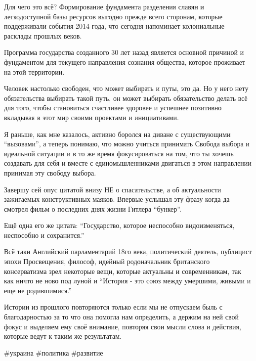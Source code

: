 Для чего это всё? Формирование фундамента разделения славян и легкодоступной
базы ресурсов выгодно прежде всего сторонам, которые поддерживали события 2014
года, что сегодня напоминает колониальные расклады прошлых веков.

Программа государства созданного 30 лет назад является основной причиной и
фундаментом для текущего направления сознания общества, которое проживает на
этой территории.

Человек настолько свободен, что может выбирать и путы, это да. Но у него нету
обязательства выбирать такой путь, он может выбирать обязательство делать всё
для того, чтобы становиться счастливее здоровее и успешнее позитивно вкладывая
в этот мир своими проектами и инициативами. 

Я раньше, как мне казалось, активно боролся на диване с существующими
\enquote{вызовами}, а теперь понимаю, что можно учиться принимать Свобода выбора и
идеальной ситуации и в то же время фокусироваться на том, что ты хочешь
создавать для себя и вместе с единомышленниками двигаться в этом направлении
принимая эту свободу выбора.

Завершу сей опус цитатой внизу НЕ о спасательстве, а об актуальности зажигаемых
конструктивных маяков. Впервые услышал эту фразу когда да смотрел фильм о
последних днях жизни Гитлера \enquote{бункер}.

Ещё одна его же цитата: \enquote{Государство, которое неспособно видоизменяться,
неспособно и сохранится.} 

Всё таки Английский парламентарий 18го века, политический деятель, публицист
эпохи Просвещения, философ, идейный родоначальник британского консерватизма
зрел некоторые вещи, которые актуальны и современникам, так как ничто не ново
под луной и \enquote{История - это союз между умершими, живыми и еще не родившимися.} 

Истории из прошлого повторяются только если мы не отпускаем быль с
благодарностью за то что она помогла нам определить, а держим на ней свой фокус
и выделяем ему своё внимание, повторяя свои мысли слова и действия, которые
ведут к таким же результатам.

\#украина \#политика \#развитие
